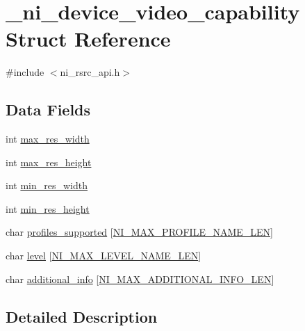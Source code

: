 \hypertarget{struct__ni__device__video__capability}{}\section{\+\_\+ni\+\_\+device\+\_\+video\+\_\+capability Struct Reference}
\label{struct__ni__device__video__capability}


{\ttfamily \#include $<$ni\+\_\+rsrc\+\_\+api.\+h$>$}

\subsection*{Data Fields}
\begin{DoxyCompactItemize}
\item 
int \mbox{\hyperlink{struct__ni__device__video__capability_a994424a3475e5591b52d063563ba1ac8}{max\+\_\+res\+\_\+width}}
\item 
int \mbox{\hyperlink{struct__ni__device__video__capability_a8397681bb260b624a183fe899acfc37b}{max\+\_\+res\+\_\+height}}
\item 
int \mbox{\hyperlink{struct__ni__device__video__capability_ae2b3b24ce9e2366832457317443f65b1}{min\+\_\+res\+\_\+width}}
\item 
int \mbox{\hyperlink{struct__ni__device__video__capability_afa619221f0365cede6753285b3c70a6e}{min\+\_\+res\+\_\+height}}
\item 
char \mbox{\hyperlink{struct__ni__device__video__capability_aa215f584caac195e37dcc9da3f80e4a4}{profiles\+\_\+supported}} \mbox{[}\mbox{\hyperlink{ni__rsrc__api_8h_a5a7b5c8942cc01883c392e9497c3a99d}{N\+I\+\_\+\+M\+A\+X\+\_\+\+P\+R\+O\+F\+I\+L\+E\+\_\+\+N\+A\+M\+E\+\_\+\+L\+EN}}\mbox{]}
\item 
char \mbox{\hyperlink{struct__ni__device__video__capability_ada35487236cb5e2ddc494fb072a8d239}{level}} \mbox{[}\mbox{\hyperlink{ni__rsrc__api_8h_a5deb9cb3cd63fd063fc3df62a60d8d40}{N\+I\+\_\+\+M\+A\+X\+\_\+\+L\+E\+V\+E\+L\+\_\+\+N\+A\+M\+E\+\_\+\+L\+EN}}\mbox{]}
\item 
char \mbox{\hyperlink{struct__ni__device__video__capability_ac96a13f9395a680102a71439a01584bf}{additional\+\_\+info}} \mbox{[}\mbox{\hyperlink{ni__rsrc__api_8h_a865548fd20c8f555b900cdc9df6d31ab}{N\+I\+\_\+\+M\+A\+X\+\_\+\+A\+D\+D\+I\+T\+I\+O\+N\+A\+L\+\_\+\+I\+N\+F\+O\+\_\+\+L\+EN}}\mbox{]}
\end{DoxyCompactItemize}


\subsection{Detailed Description}


